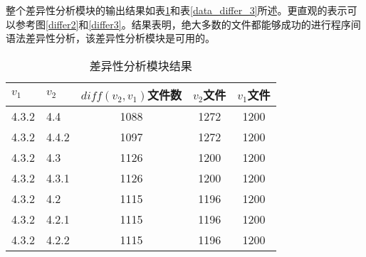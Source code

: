 %
%
%
%
整个差异性分析模块的输出结果如表\ref {data_differ_2}和表\ref {data_differ_3}所述。更直观的表示可以参考图\ref {differ2}和\ref {differ3}。结果表明，绝大多数的文件都能够成功的进行程序间语法差异性分析，该差异性分析模块是可用的。

\begin{table}[H]
	\caption{差异性分析模块结果}
	\label{data_differ_2}
	\centering
	\begin{tabular}{llccc}
		\toprule[1.5pt]
		{\heiti $v_1$} & {\heiti $v_2$} & {\heiti $diff(v_2,v_1)$文件数} & {\heiti $v_2$文件} & {\heiti $v_1$文件} \\\midrule[1pt]
		4.3.2 & 4.4	& 1088 & 1272 & 1200\\		
		4.3.2 & 4.4.2 & 1097 & 1272	& 1200	\\
		4.3.2 & 4.3 	 & 1126 & 1200	& 1200		\\
		4.3.2 & 4.3.1  & 1126 & 1200 & 1200			\\
		4.3.2 & 4.2 	& 1115 & 1196 & 1200		\\
		4.3.2 & 4.2.1 & 1115 & 1196 & 1200		\\
		4.3.2 & 4.2.2  & 1115 & 1196 & 1200		\\
		\bottomrule[1.5pt]
	\end{tabular}
\end{table}

